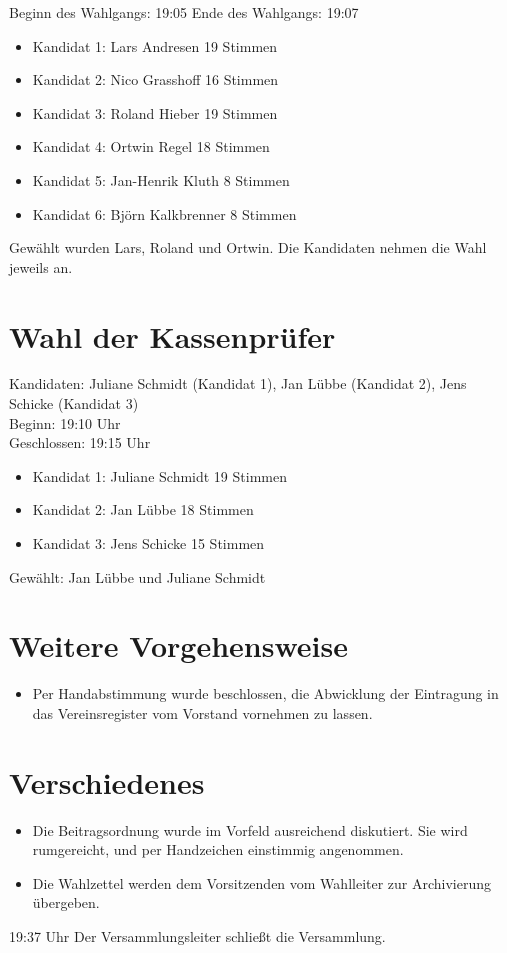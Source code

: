 \documentclass[a4paper,12pt]{scrartcl}
\begin{document}
Beginn des Wahlgangs: 19:05
Ende des Wahlgangs: 19:07

\begin{itemize}
    \item Kandidat 1: Lars Andresen 19 Stimmen
    \item Kandidat 2: Nico Grasshoff 16 Stimmen
    \item Kandidat 3: Roland Hieber 19 Stimmen
    \item Kandidat 4: Ortwin Regel 18 Stimmen
    \item Kandidat 5: Jan-Henrik Kluth 8 Stimmen
    \item Kandidat 6: Björn Kalkbrenner 8 Stimmen
\end{itemize}

Gewählt wurden Lars, Roland und Ortwin. Die Kandidaten nehmen die Wahl jeweils
an.


\section{Wahl der Kassenprüfer}

Kandidaten: Juliane Schmidt (Kandidat 1), Jan Lübbe (Kandidat 2), Jens Schicke
(Kandidat 3) \\

Beginn: 19:10 Uhr \\
Geschlossen: 19:15 Uhr

\begin{itemize}
    \item Kandidat 1: Juliane Schmidt 19 Stimmen
    \item Kandidat 2: Jan Lübbe 18 Stimmen
    \item Kandidat 3: Jens Schicke 15 Stimmen
\end{itemize}

Gewählt: Jan Lübbe und Juliane Schmidt\\

\pagebreak

\section{Weitere Vorgehensweise}
\begin{itemize}
    \item Per Handabstimmung wurde beschlossen, die Abwicklung der Eintragung
        in das Vereinsregister vom Vorstand vornehmen zu lassen.
\end{itemize}

\section{Verschiedenes}
\begin{itemize}
    \item Die Beitragsordnung wurde im Vorfeld ausreichend diskutiert. Sie
        wird rumgereicht, und per Handzeichen einstimmig angenommen.
    \item Die Wahlzettel werden dem Vorsitzenden vom Wahlleiter zur
        Archivierung übergeben.
\end{itemize}


19:37 Uhr Der Versammlungsleiter schlie\ss{}t die Versammlung.
\end{document}
